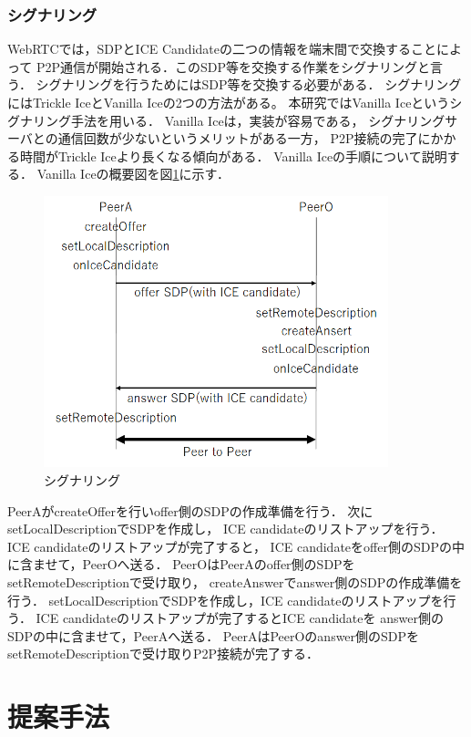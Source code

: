\documentclass[sotsuron]{jcsie}
\begin{document}
\subsection{シグナリング}
WebRTCでは，SDPとICE Candidateの二つの情報を端末間で交換することによって
P2P通信が開始される．このSDP等を交換する作業をシグナリングと言う．
シグナリングを行うためにはSDP等を交換する必要がある．
シグナリングにはTrickle IceとVanilla Iceの2つの方法がある。
本研究ではVanilla Iceというシグナリング手法を用いる．
Vanilla Iceは，実装が容易である，
シグナリングサーバとの通信回数が少ないというメリットがある一方，
P2P接続の完了にかかる時間がTrickle Iceより長くなる傾向がある．
Vanilla Iceの手順について説明する．
Vanilla Iceの概要図を図\ref{fig:signaling}に示す．
\begin{figure}[H]
	\centering
	\includegraphics[width=10cm]{./assets/image/signaling.png}
	\caption{シグナリング}
	\label{fig:signaling}
\end{figure}
PeerAがcreateOfferを行いoffer側のSDPの作成準備を行う．
次にsetLocalDescriptionでSDPを作成し，
ICE candidateのリストアップを行う．
ICE candidateのリストアップが完了すると，
ICE candidateをoffer側のSDPの中に含ませて，PeerOへ送る．
PeerOはPeerAのoffer側のSDPをsetRemoteDescriptionで受け取り，
createAnswerでanswer側のSDPの作成準備を行う．
setLocalDescriptionでSDPを作成し，ICE candidateのリストアップを行う．
ICE candidateのリストアップが完了するとICE candidateを
answer側のSDPの中に含ませて，PeerAへ送る．
PeerAはPeerOのanswer側のSDPをsetRemoteDescriptionで受け取りP2P接続が完了する．


\chapter{提案手法}
\end{document}
